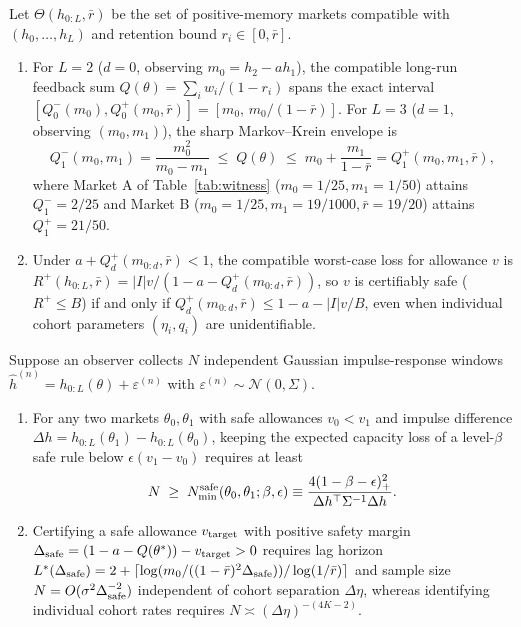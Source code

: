 \begin{theorem}\label{thm:flagship_B}
Let $\Theta(h_{0:L},\bar r)$ be the set of positive-memory markets compatible with $(h_0,\ldots,h_L)$ and retention bound $r_i\in[0,\bar r]$.
\begin{enumerate}[label=(\roman*)]
\item For $L=2$ ($d=0$, observing $m_0=h_2-ah_1$), the compatible long-run feedback sum $Q(\theta)=\sum_i w_i/(1-r_i)$ spans the exact interval $[Q_0^-(m_0),Q_0^+(m_0,\bar r)]=[m_0,\,m_0/(1-\bar r)]$. For $L=3$ ($d=1$, observing $(m_0,m_1)$), the sharp Markov--Krein envelope is
\[
Q_1^-(m_0,m_1)=\frac{m_0^2}{m_0-m_1}\;\le\;Q(\theta)\;\le\;m_0+\frac{m_1}{1-\bar r}=Q_1^+(m_0,m_1,\bar r),
\]
where Market A of Table~\ref{tab:witness} ($m_0=1/25,m_1=1/50$) attains $Q_1^-=2/25$ and Market B ($m_0=1/25,m_1=19/1000,\bar r=19/20$) attains $Q_1^+=21/50$.
\item Under $a+Q_d^+(m_{0:d},\bar r)<1$, the compatible worst-case loss for allowance $v$ is $R^+(h_{0:L},\bar r)=|I|v/(1-a-Q_d^+(m_{0:d},\bar r))$, so $v$ is certifiably safe ($R^+\le B$) if and only if $Q_d^+(m_{0:d},\bar r)\le 1-a-|I|v/B$, even when individual cohort parameters $(\eta_i,q_i)$ are unidentifiable.
\end{enumerate}
\end{theorem}

\begin{theorem}\label{thm:flagship_C}
Suppose an observer collects $N$ independent Gaussian impulse-response windows $\hat h^{(n)}=h_{0:L}(\theta)+\varepsilon^{(n)}$ with $\varepsilon^{(n)}\sim\mathcal N(0,\Sigma)$.
\begin{enumerate}[label=(\roman*)]
\item For any two markets $\theta_0,\theta_1$ with safe allowances $v_0<v_1$ and impulse difference $\Delta h=h_{0:L}(\theta_1)-h_{0:L}(\theta_0)$, keeping the expected capacity loss of a level-$\beta$ safe rule below $\epsilon(v_1-v_0)$ requires at least
\[
N\;\ge\;N_{\min}^{\rm safe}(\theta_0,\theta_1;\beta,\epsilon)\equiv\frac{4(1-\beta-\epsilon)_+^2}{\Delta h^\top\Sigma^{-1}\Delta h}.
\]
\item Certifying a safe allowance $v_{\rm target}$ with positive safety margin $\Delta_{\rm safe}=(1-a-Q(\theta^*))-v_{\rm target}>0$ requires lag horizon $L^*(\Delta_{\rm safe})=2+\lceil\log(m_0/((1-\bar r)^2\Delta_{\rm safe}))/\log(1/\bar r)\rceil$ and sample size $N=O(\sigma^2\Delta_{\rm safe}^{-2})$ independent of cohort separation $\Delta\eta$, whereas identifying individual cohort rates requires $N\asymp(\Delta\eta)^{-(4K-2)}$.
\end{enumerate}
\end{theorem}

